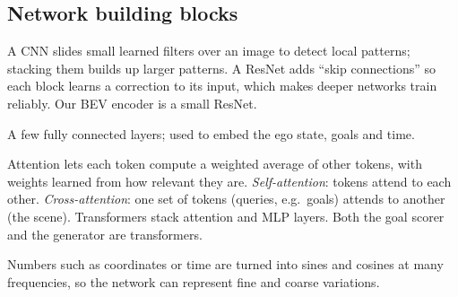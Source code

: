 \documentclass[11pt,a4paper]{article}
\begin{document}
\subsection{Network building blocks}
\begin{description}[style=nextline,leftmargin=0pt]
  \item[Convolutional neural network (CNN) and ResNet] A CNN slides small learned filters over an image to
        detect local patterns; stacking them builds up larger patterns. A ResNet adds ``skip connections'' so
        each block learns a correction to its input, which makes deeper networks train reliably. Our BEV
        encoder is a small ResNet.
  \item[Multilayer perceptron (MLP)] A few fully connected layers; used to embed the ego state, goals and time.
  \item[Transformer and attention] Attention lets each token compute a weighted average of other tokens,
        with weights learned from how relevant they are. \emph{Self-attention}: tokens attend to each other.
        \emph{Cross-attention}: one set of tokens (queries, e.g.\ goals) attends to another (the scene).
        Transformers stack attention and MLP layers. Both the goal scorer and the generator are transformers.
  \item[Sinusoidal encoding] Numbers such as coordinates or time are turned into sines and cosines at many
        frequencies, so the network can represent fine and coarse variations.
\end{description}
\end{document}
